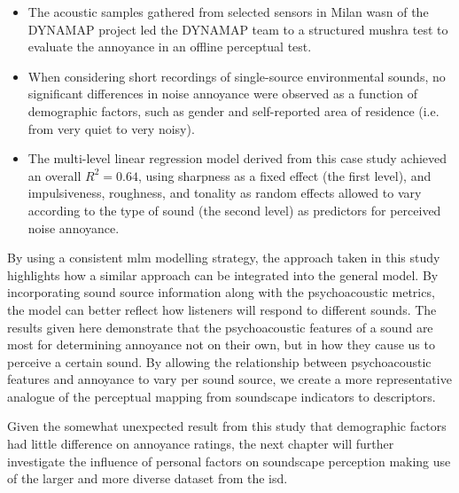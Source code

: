 \begin{itemize}
  \item The acoustic samples gathered from selected sensors in Milan \gls{wasn} of the DYNAMAP project led the DYNAMAP team to a structured \gls{mushra} test to evaluate the annoyance in an offline perceptual test.
  \item When considering short recordings of single-source environmental sounds, no significant differences in noise annoyance were observed as a function of demographic factors, such as gender and self-reported area of residence (i.e. from very quiet to very noisy).
  \item The multi-level linear regression model derived from this case study achieved an overall $R^2=0.64$, using sharpness as a fixed effect (the first level), and impulsiveness, roughness, and tonality as random effects allowed to vary according to the type of sound (the second level) as predictors for perceived noise annoyance.
\end{itemize}

By using a consistent \gls{mlm} modelling strategy, the approach taken in this study highlights how a similar approach can be integrated into the general model. By incorporating sound source information along with the psychoacoustic metrics, the model can better reflect how listeners will respond to different sounds. The results given here demonstrate that the psychoacoustic features of a sound are most for determining annoyance not on their own, but in how they cause us to perceive a certain sound. By allowing the relationship between psychoacoustic features and annoyance to vary per sound source, we create a more representative analogue of the perceptual mapping from soundscape indicators to descriptors. 

Given the somewhat unexpected result from this study that demographic factors had little difference on annoyance ratings, the next chapter will further investigate the influence of personal factors on soundscape perception making use of the larger and more diverse dataset from the \gls{isd}.



